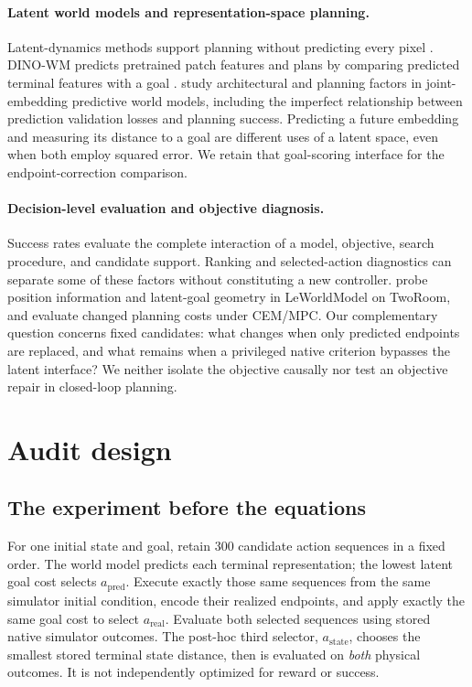 \documentclass{article}
\begin{document}
\paragraph{Latent world models and representation-space planning.}
Latent-dynamics methods support planning without predicting every pixel
\citep{pmlr-v97-hafner19a}. DINO-WM predicts pretrained patch features and plans
by comparing predicted terminal features with a goal \citep{pmlr-v267-zhou25t}.
\citet{terver2026drives} study architectural and planning factors in
joint-embedding predictive world models, including the imperfect relationship
between prediction validation losses and planning success. Predicting a future
embedding and measuring its distance to a goal are different uses of a latent
space, even when both employ squared error. We retain that goal-scoring
interface for the endpoint-correction comparison.

\paragraph{Decision-level evaluation and objective diagnosis.}
Success rates evaluate the complete interaction of a model, objective, search
procedure, and candidate support. Ranking and selected-action diagnostics can
separate some of these factors without constituting a new controller.
\citet{singh2026objective} probe position information and latent-goal geometry
in LeWorldModel on TwoRoom, and evaluate changed planning costs under CEM/MPC.
Our complementary question concerns fixed candidates: what changes when only
predicted endpoints are replaced, and what remains when a privileged native
criterion bypasses the latent interface? We neither isolate the objective
causally nor test an objective repair in closed-loop planning.

\section{Audit design}
\label{sec:method}

\subsection{The experiment before the equations}

For one initial state and goal, retain 300 candidate action sequences in a fixed
order. The world model predicts each terminal representation; the lowest
latent goal cost selects $a_{\mathrm{pred}}$. Execute exactly those same
sequences from the same simulator initial condition, encode their realized
endpoints, and apply exactly the same goal cost to select $a_{\mathrm{real}}$.
Evaluate both selected sequences using stored native simulator outcomes.
The post-hoc third selector, $a_{\mathrm{state}}$, chooses the smallest stored
terminal state distance, then is evaluated on \emph{both} physical outcomes.
It is not independently optimized for reward or success.
\end{document}
